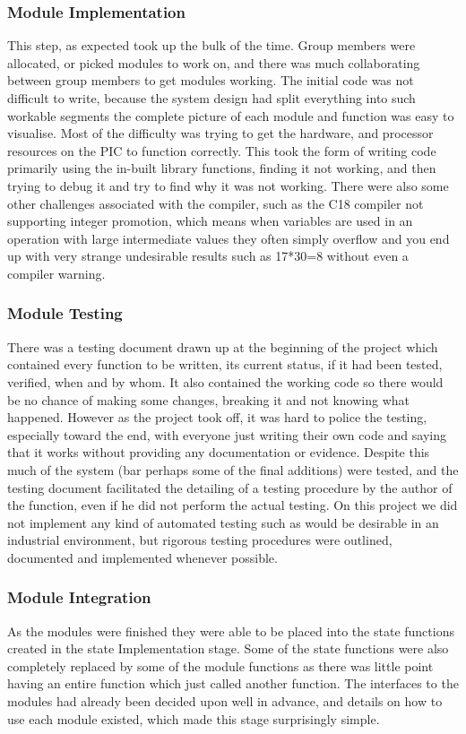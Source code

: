 \documentclass[]{report}
\begin{document}
\subsubsection{Module Implementation}
This step, as expected took up the bulk of the time. Group members were allocated, or picked modules to work on, and there was much collaborating between group members to get modules working. The initial code was not difficult to write, because the system design had split everything into such workable segments the complete picture of each module and function was easy to visualise. Most of the difficulty was trying to get the hardware, and processor resources on the PIC to function correctly. This took the form of writing code primarily using the in-built library functions, finding it not working, and then trying to debug it and try to find why it was not working. There were also some other challenges associated with the compiler, such as the C18 compiler not supporting integer promotion, which means when variables are used in an operation with large intermediate values they often simply overflow and you end up with very strange undesirable results such as 17*30=8 without even a compiler warning.

\subsubsection{Module Testing}
There was a testing document drawn up at the beginning of the project which contained every function to be written, its current status, if it had been tested, verified, when and by whom. It also contained the working code so there would be no chance of making some changes, breaking it and not knowing what happened. However as the project took off, it was hard to police the testing, especially toward the end, with everyone just writing their own code and saying that it works without providing any documentation or evidence. Despite this much of the system (bar perhaps some of the final additions) were tested, and the testing document facilitated the detailing of a testing procedure by the author of the function, even if he did not perform the actual testing. \newline
On this project we did not implement any kind of automated testing such as would be desirable in an industrial environment, but rigorous testing procedures were outlined, documented and implemented whenever possible.

\subsubsection{Module Integration}
As the modules were finished they were able to be placed into the state functions created in the state Implementation stage. Some of the state functions were also completely replaced by some of the module functions as there was little point having an entire function which just called another function. The interfaces to the modules had already been decided upon well in advance, and details on how to use each module existed, which made this stage surprisingly simple.
\end{document}
